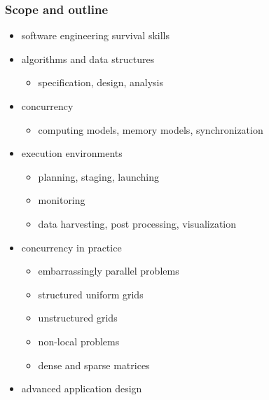 \begin{frame}[fragile]
%
  \frametitle{Scope and outline}
%
%
  \begin{itemize}
%
  \item software engineering survival skills
%
  \item algorithms and data structures
    \begin{itemize}
    \item specification, design, analysis
    \end{itemize}
%
  \item concurrency
    \begin{itemize}
    \item computing models, memory models, synchronization
    \end{itemize}
%
  \item execution environments
    \begin{itemize}
    \item planning, staging, launching
    \item monitoring
    \item data harvesting, post processing, visualization
    \end{itemize}
%
  \item concurrency in practice
    \begin{itemize}
    \item embarrassingly parallel problems
    \item structured uniform grids
    \item unstructured grids
    \item non-local problems
    \item dense and sparse matrices
    \end{itemize}
%
  \item advanced application design
%
  \end{itemize}
%
\end{frame}

